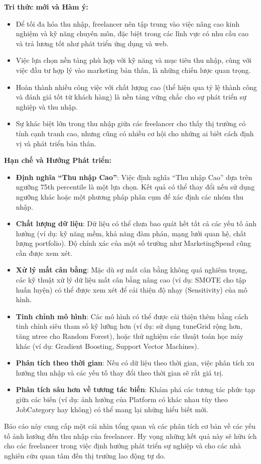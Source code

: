\documentclass[
]{article}
\begin{document}
\textbf{Tri thức mới và Hàm ý:}

\begin{itemize}
\item
  Để tối đa hóa thu nhập, freelancer nên tập trung vào việc nâng cao
  kinh nghiệm và kỹ năng chuyên môn, đặc biệt trong các lĩnh vực có nhu
  cầu cao và trả lương tốt như phát triển ứng dụng và web.
\item
  Việc lựa chọn nền tảng phù hợp với kỹ năng và mục tiêu thu nhập, cùng
  với việc đầu tư hợp lý vào marketing bản thân, là những chiến lược
  quan trọng.
\item
  Hoàn thành nhiều công việc với chất lượng cao (thể hiện qua tỷ lệ
  thành công và đánh giá tốt từ khách hàng) là nền tảng vững chắc cho sự
  phát triển sự nghiệp và thu nhập.
\item
  Sự khác biệt lớn trong thu nhập giữa các freelancer cho thấy thị
  trường có tính cạnh tranh cao, nhưng cũng có nhiều cơ hội cho những ai
  biết cách định vị và phát triển bản thân.
\end{itemize}

\textbf{Hạn chế và Hướng Phát triển:}

\begin{itemize}
\item
  \textbf{Định nghĩa ``Thu nhập Cao''}: Việc định nghĩa ``Thu nhập Cao''
  dựa trên ngưỡng 75th percentile là một lựa chọn. Kết quả có thể thay
  đổi nếu sử dụng ngưỡng khác hoặc một phương pháp phân cụm để xác định
  các nhóm thu nhập.
\item
  \textbf{Chất lượng dữ liệu}: Dữ liệu có thể chưa bao quát hết tất cả
  các yếu tố ảnh hưởng (ví dụ: kỹ năng mềm, khả năng đàm phán, mạng lưới
  quan hệ, chất lượng portfolio). Độ chính xác của một số trường như
  MarketingSpend cũng cần được xem xét.
\item
  \textbf{Xử lý mất cân bằng}: Mặc dù sự mất cân bằng không quá nghiêm
  trọng, các kỹ thuật xử lý dữ liệu mất cân bằng nâng cao (ví dụ: SMOTE
  cho tập huấn luyện) có thể được xem xét để cải thiện độ nhạy
  (Sensitivity) của mô hình.
\item
  \textbf{Tinh chỉnh mô hình}: Các mô hình có thể được cải thiện thêm
  bằng cách tinh chỉnh siêu tham số kỹ lưỡng hơn (ví dụ: sử dụng
  tuneGrid rộng hơn, tăng ntree cho Random Forest), hoặc thử nghiệm các
  thuật toán học máy khác (ví dụ: Gradient Boosting, Support Vector
  Machines).
\item
  \textbf{Phân tích theo thời gian}: Nếu có dữ liệu theo thời gian, việc
  phân tích xu hướng thu nhập và các yếu tố thay đổi theo thời gian sẽ
  rất giá trị.
\item
  \textbf{Phân tích sâu hơn về tương tác biến}: Khám phá các tương tác
  phức tạp giữa các biến (ví dụ: ảnh hưởng của Platform có khác nhau tùy
  theo JobCategory hay không) có thể mang lại những hiểu biết mới.
\end{itemize}

Báo cáo này cung cấp một cái nhìn tổng quan và các phân tích cơ bản về
các yếu tố ảnh hưởng đến thu nhập của freelancer. Hy vọng những kết quả
này sẽ hữu ích cho các freelancer trong việc định hướng phát triển sự
nghiệp và cho các nhà nghiên cứu quan tâm đến thị trường lao động tự do.
\end{document}
